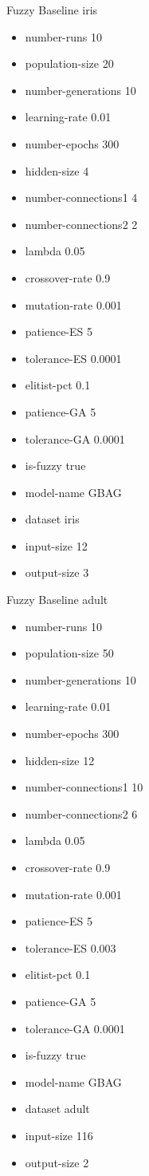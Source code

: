 Fuzzy Baseline
iris
\begin{itemize}
\item number-runs 10
\item population-size 20
\item number-generations 10
\item learning-rate 0.01
\item number-epochs 300
\item hidden-size 4
\item number-connections1 4
\item number-connections2 2
\item lambda 0.05
\item crossover-rate 0.9
\item mutation-rate 0.001
\item patience-ES 5
\item tolerance-ES 0.0001
\item elitist-pct 0.1
\item patience-GA 5
\item tolerance-GA 0.0001
\item is-fuzzy true
\item model-name GBAG
\item dataset iris
\item input-size 12
\item output-size 3
\end{itemize}

Fuzzy Baseline
adult
\begin{itemize}
\item number-runs 10
\item population-size 50
\item number-generations 10
\item learning-rate 0.01
\item number-epochs 300
\item hidden-size 12
\item number-connections1 10
\item number-connections2 6
\item lambda 0.05
\item crossover-rate 0.9
\item mutation-rate 0.001
\item patience-ES 5
\item tolerance-ES 0.003
\item elitist-pct 0.1
\item patience-GA 5
\item tolerance-GA 0.0001
\item is-fuzzy true
\item model-name GBAG
\item dataset adult
\item input-size 116
\item output-size 2
\end{itemize}

